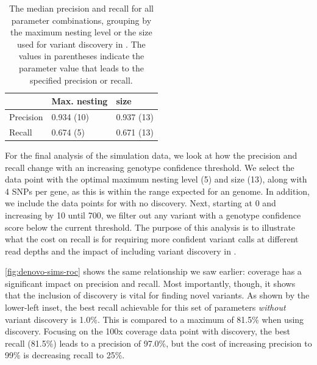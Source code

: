 \begin{table}
\centering
\begin{tabular}{@{}lll@{}}
\toprule
          & Max. nesting & \denovo{} \kmer{} size \\ \midrule
Precision & 0.934 (10)   & 0.937 (13)                                               \\
Recall    & 0.674 (5)    & 0.671 (13)                                               \\ \bottomrule
\end{tabular}
\caption{The median precision and recall for all parameter combinations, grouping by the maximum \prg{} nesting level or the \denovo{} \kmer{} size used for variant discovery in \pandora{}. The values in parentheses indicate the parameter value that leads to the specified precision or recall.}
\label{tab:denovo-summary}
\end{table}

For the final analysis of the simulation data, we look at how the precision and recall change with an increasing genotype confidence threshold. We select the data point with the optimal maximum nesting level (5) and \denovo{} \kmer{} size (13), along with 4 SNPs per gene, as this is within the range expected for an \ecoli{} genome. In addition, we include the data points for \pandora{} with no \denovo{} discovery. Next, starting at 0 and increasing by 10 until 700, we filter out any variant with a genotype confidence score below the current threshold. The purpose of this analysis is to illustrate what the cost on recall is for requiring more confident variant calls at different read depths and the impact of including \denovo{} variant discovery in \pandora{}. 

\autoref{fig:denovo-sims-roc} shows the same relationship we saw earlier: coverage has a significant impact on precision and recall. Most importantly, though, it shows that the inclusion of \denovo{} discovery is vital for finding novel variants. As shown by the lower-left inset, the best recall achievable for this set of parameters \emph{without} variant discovery is 1.0\%. This is compared to a maximum of 81.5\% when using \denovo{} discovery. Focusing on the 100x coverage data point with \denovo{} discovery, the best recall (81.5\%) leads to a precision of 97.0\%, but the cost of increasing precision to 99\% is decreasing recall to 25\%. 


